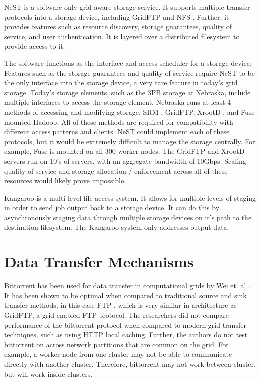 NeST \cite{bent2002flexibility} is a software-only grid aware storage service.  It supports multiple transfer protocols into a storage device, including GridFTP \cite{allcock2005globus} and NFS \cite{walsh1985overview}.  Further, it provides features such as resource discovery, storage guarantees, quality of service, and user authentication.  It is layered over a distributed filesystem to provide access to it.

The software functions as the interface and access scheduler for a storage device.  Features such as the storage guarantees and quality of service require NeST to be the only interface into the storage device, a very rare feature in today's grid storage.  Today's storage elements, such as the 3PB storage at Nebraska, include multiple interfaces to access the storage element.  Nebraska runs at least 4 \cite{attebury2009hadoop} methods of accessing and modifying storage, SRM \cite{shoshani2002storage}, GridFTP, XrootD \cite{dorigo2005xrootd}, and Fuse \cite{szeredi2010fuse} mounted Hadoop.  All of these methods are required for compatibility with different access patterns and clients.  NeST could implement each of these protocols, but it would be extremely difficult to manage the storage centrally.  For example, Fuse is mounted on all 300 worker nodes.  The GridFTP and XrootD servers run on 10's of servers, with an aggregate bandwidth of 10Gbps.  Scaling quality of service and storage allocation / enforcement across all of these resources would likely prove impossible.




Kangaroo \cite{thain2001kangaroo} is a multi-level file access system.  It allows for multiple levels of staging in order to send job output back to a storage device.  It can do this by asynchronously staging data through multiple storage devices on it's path to the destination filesystem.  The Kangaroo system only addresses output data.

\section{Data Transfer Mechanisms}

Bittorrent has been used for data transfer in computational grids by Wei et. al \cite{wei2005collaborative, wei2005scheduling, wei2007towards}.  It has been shown to be optimal when compared to traditional source and sink transfer methods, in this case FTP \cite{postel1985file}, which is very similar in architecture as GridFTP, a grid enabled FTP protocol.  The researchers did not compare performance of the bittorrent protocol when compared to modern grid transfer techniques, such as using HTTP local caching.  Further, the authors do not test bittorrent on across network partitions that are common on the grid.  For example, a worker node from one cluster may not be able to communicate directly with another cluster.  Therefore, bittorrent may not work between cluster, but will work inside clusters.

